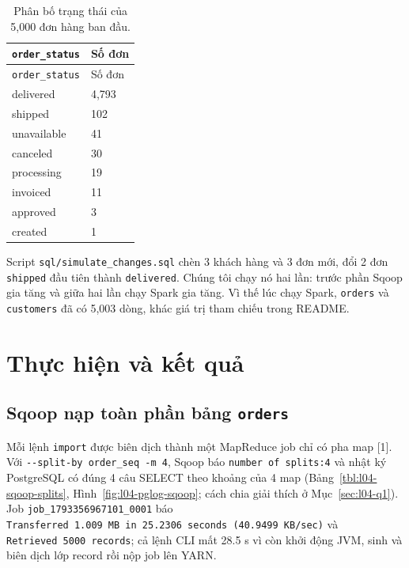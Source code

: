\documentclass[
  12pt,
  a4paper,
]{report}
\begin{document}
\begin{longtable}[]{@{}ll@{}}
\caption{\label{tbl:l04-status}Phân bố trạng thái của 5,000 đơn hàng ban
đầu.}\tabularnewline
\toprule\noalign{}
\texttt{order\_status} & Số đơn \\
\midrule\noalign{}
\endfirsthead
\toprule\noalign{}
\texttt{order\_status} & Số đơn \\
\midrule\noalign{}
\endhead
\bottomrule\noalign{}
\endlastfoot
delivered & 4,793 \\
shipped & 102 \\
unavailable & 41 \\
canceled & 30 \\
processing & 19 \\
invoiced & 11 \\
approved & 3 \\
created & 1 \\
\end{longtable}

Script
\texttt{sql/}\allowbreak{}\texttt{simulate\_}\allowbreak{}\texttt{changes.}\allowbreak{}\texttt{sql}\allowbreak{}
chèn 3 khách hàng và 3 đơn mới, đổi 2 đơn \texttt{shipped} đầu tiên
thành \texttt{delivered}. Chúng tôi chạy nó hai lần: trước phần Sqoop
gia tăng và giữa hai lần chạy Spark gia tăng. Vì thế lúc chạy Spark,
\texttt{orders} và \texttt{customers} đã có 5,003 dòng, khác giá trị
tham chiếu trong README.

\section{Thực hiện và kết quả}\label{sec:l04-results}

\subsection{\texorpdfstring{Sqoop nạp toàn phần bảng
\texttt{orders}}{Sqoop nạp toàn phần bảng orders}}\label{sec:l04-sqoop-full}

Mỗi lệnh \texttt{import} được biên dịch thành một MapReduce job chỉ có
pha map {[}1{]}. Với
\texttt{-\/-split-by\ order\_}\allowbreak{}\texttt{seq\ -m\ 4}\allowbreak{},
Sqoop báo
\texttt{number\ of\ splits:}\allowbreak{}\texttt{4}\allowbreak{} và nhật
ký PostgreSQL có đúng 4 câu SELECT theo khoảng của 4 map
(Bảng~\ref{tbl:l04-sqoop-splits}, Hình~\ref{fig:l04-pglog-sqoop}; cách
chia giải thích ở Mục~\ref{sec:l04-q1}). Job
\texttt{job\_}\allowbreak{}\texttt{1793356967101\_}\allowbreak{}\texttt{0001}\allowbreak{}
báo
\texttt{Transferred\ 1.}\allowbreak{}\texttt{009\ MB\ in\ 25.}\allowbreak{}\texttt{2306\ seconds\ (40.}\allowbreak{}\texttt{9499\ KB/}\allowbreak{}\texttt{sec)}\allowbreak{}
và \texttt{Retrieved\ 5000\ records}\allowbreak{}; cả lệnh CLI mất 28.5
s vì còn khởi động JVM, sinh và biên dịch lớp record rồi nộp job lên
YARN.
\end{document}
